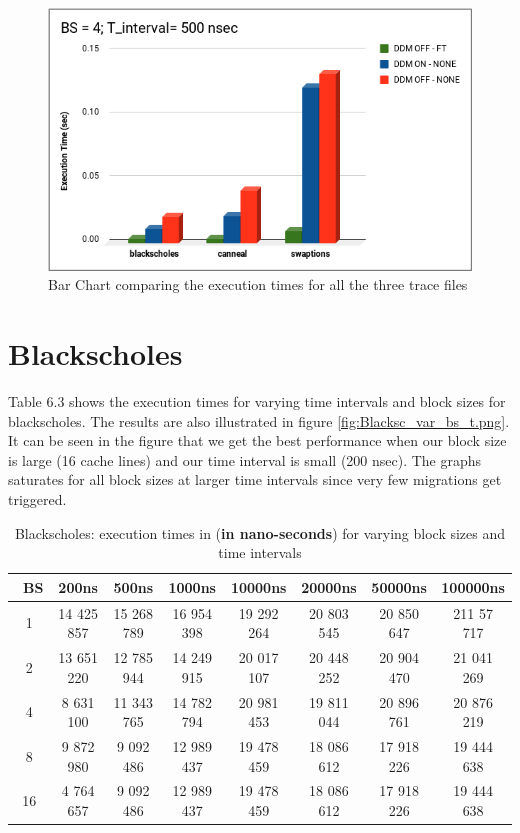 \documentclass{listhesis}
\begin{document}
\begin{figure}
  \includegraphics[width=\linewidth]{Bla_cann_Swap_BS_4_T_500.png}
  \centering
  \caption{Bar Chart comparing the execution times for all the three trace files}
  \label{fig:Bla_cann_Swap_BS_4_T_500.png}
\end{figure}

\section{Blackscholes}
Table 6.3 shows the execution times for varying time intervals and block sizes for blackscholes. The results are also illustrated in figure \ref{fig:Blacksc_var_bs_t.png}. It can be seen in the figure that we get the best performance when our block size is large (16 cache lines) and our time interval is small (200 nsec). The graphs saturates for all block sizes at larger time intervals since very few migrations get triggered. 

\begin{table}[h!]
\begin{center}
 \begin{tabular}{|| c | c | c | c| c | c | c | c||} 
 \hline
 \ \textbf{BS} & \textbf{200ns}  & \textbf{500ns}  & \textbf{1000ns} & \textbf{10000ns} & \textbf{20000ns} & \textbf{50000ns} & \textbf{100000ns}\\ [0.5 ex] 
 \hline\hline
   1 & 14 425 857  & 15 268 789 &  16 954 398 & 19 292 264 & 20 803 545 & 20 850 647 &  211 57 717\\ 
 \hline
   2 & 13 651 220 & 12 785 944 & 14 249 915 & 20 017 107 & 20 448 252 & 20 904 470 & 21 041 269\\
 \hline
   4 & 8 631 100 & 11 343 765 & 14 782 794 & 20 981 453 & 19 811 044 & 20 896 761 & 20 876 219\\
 \hline
   8 & 9 872 980 & 9 092 486 & 12 989 437 & 19 478 459 & 18 086 612 & 17 918 226 & 19 444 638\\
  \hline
   16 & 4 764 657 & 9 092 486 & 12 989 437 & 19 478 459 & 18 086 612 & 17 918 226 & 19 444 638\\
    \hline
\end{tabular}
 \caption{Blackscholes: execution times in (\textbf{in nano-seconds}) for varying block sizes and time intervals}
 \label{table:ExecTimes2}
\end{center}
\end{table}
\end{document}

